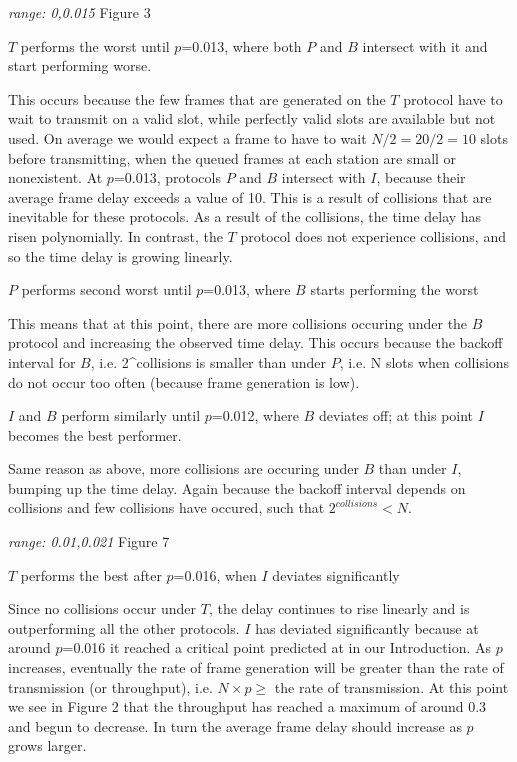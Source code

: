 \documentclass[twocolumn]{article}
\begin{document}
\emph{range: 0,0.015} Figure 3

$T$ performs the worst until $p$=0.013, where both $P$ and $B$ intersect with it and start performing worse.

This occurs because the few frames that are generated on the $T$ protocol have to wait to transmit on a valid slot,
while perfectly valid slots are available but not used. On average we would expect a frame to have to wait $N/2 = 20/2 = 10$
slots before transmitting, when the queued frames at each station are small or nonexistent. At $p$=0.013, protocols $P$
and $B$ intersect with $I$, because their average frame delay exceeds a value of 10. This is a result of collisions
that are inevitable for these protocols. As a result of the collisions, the time delay has risen polynomially. In contrast,
the $T$ protocol does not experience collisions, and so the time delay is growing linearly.

$P$ performs second worst until $p$=0.013, where $B$ starts performing the worst

This means that at this point, there are more collisions occuring under the $B$ protocol and increasing the
observed time delay. This occurs because the backoff interval for $B$, i.e. 2^{collisions} is smaller than under $P$, i.e. N slots when collisions do not
occur too often (because frame generation is low).

$I$ and $B$ perform similarly until $p$=0.012, where $B$ deviates off; at this point $I$ becomes the 
best performer.

Same reason as above, more collisions are occuring under $B$ than under $I$, bumping up the time delay. Again because
the backoff interval depends on collisions and few collisions have occured, such that $2^{collisions} < N$.

\emph{range: 0.01,0.021} Figure 7

$T$ performs the best after $p$=0.016, when $I$ deviates significantly

Since no collisions occur under $T$, the delay continues to rise linearly and is outperforming all the other
protocols. $I$ has deviated significantly because at around $p$=0.016 it reached a critical point predicted at
in our Introduction. As $p$ increases, eventually the rate of frame generation will be greater than the rate of
transmission (or throughput), i.e. $N\times p \geq$ the rate of transmission. At this point we see in 
Figure 2 that the throughput has reached a maximum of around 0.3 and begun to decrease. In turn the average frame
delay should increase as $p$ grows larger.
\end{document}
